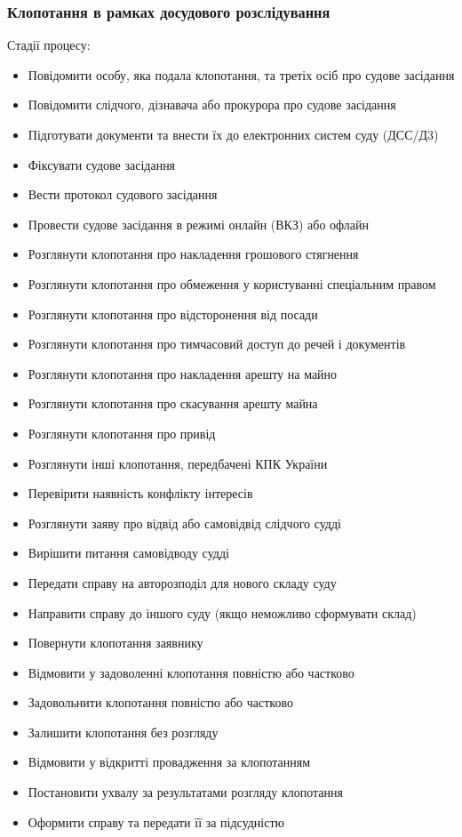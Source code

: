 \documentclass{article}
\begin{document}
\newpage
\subsubsection{Клопотання в рамках досудового розслідування}

Стадії процесу:

\begin{itemize}
    \item Повідомити особу, яка подала клопотання, та третіх осіб про судове засідання
    \item Повідомити слідчого, дізнавача або прокурора про судове засідання
    \item Підготувати документи та внести їх до електронних систем суду (ДСС/Д3)
    \item Фіксувати судове засідання
    \item Вести протокол судового засідання
    \item Провести судове засідання в режимі онлайн (ВКЗ) або офлайн
    \item Розглянути клопотання про накладення грошового стягнення
    \item Розглянути клопотання про обмеження у користуванні спеціальним правом
    \item Розглянути клопотання про відсторонення від посади
    \item Розглянути клопотання про тимчасовий доступ до речей і документів
    \item Розглянути клопотання про накладення арешту на майно
    \item Розглянути клопотання про скасування арешту майна
    \item Розглянути клопотання про привід
    \item Розглянути інші клопотання, передбачені КПК України
    \item Перевірити наявність конфлікту інтересів
    \item Розглянути заяву про відвід або самовідвід слідчого судді
    \item Вирішити питання самовідводу судді
    \item Передати справу на авторозподіл для нового складу суду
    \item Направити справу до іншого суду (якщо неможливо сформувати склад)
    \item Повернути клопотання заявнику
    \item Відмовити у задоволенні клопотання повністю або частково
    \item Задовольнити клопотання повністю або частково
    \item Залишити клопотання без розгляду
    \item Відмовити у відкритті провадження за клопотанням
    \item Постановити ухвалу за результатами розгляду клопотання
    \item Оформити справу та передати її за підсудністю
\end{itemize}
\end{document}
